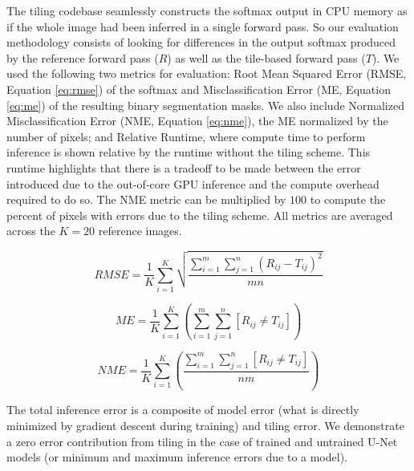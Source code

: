 \documentclass[runningheads]{llncs}
\begin{document}
The tiling codebase seamlessly constructs the softmax output in CPU memory as if the whole image had been inferred in a single forward pass. So our evaluation methodology consists of looking for differences in the output softmax produced by the reference forward pass ($R$) as well as the tile-based forward pass ($T$). We used the following two metrics for evaluation: Root Mean Squared Error (RMSE, Equation \ref{eq:rmse}) of the softmax and Misclassification Error (ME, Equation \ref{eq:me}) of the resulting binary segmentation masks. %
We also include Normalized Misclassification Error (NME, Equation \ref{eq:nme}), the ME normalized by the number of pixels; and Relative Runtime, where compute time to perform inference is shown relative by the runtime without the tiling scheme. This runtime highlights that there is a tradeoff to be made between the error introduced due to the out-of-core GPU inference and the compute overhead required to do so. The NME metric can be multiplied by $100$ to compute the percent of pixels with errors due to the tiling scheme.
All metrics are averaged across the $K = 20$ reference images.

\begin{equation}
RMSE = \frac{1}{K} \sum_{i=1}^{K} \sqrt{ \frac{\sum_{i = 1}^{m} \sum_{j = 1}^{n} (R_{ij} - T_{ij})^2}{mn}}
\label{eq:rmse}
\end{equation}

\begin{equation}
ME = \frac{1}{K} \sum_{i=1}^{K} \left( \sum_{i = 1}^{m} \sum_{j = 1}^{n} [ R_{ij} \neq T_{ij} ] \right) 
\label{eq:me}
\end{equation}

\begin{equation}
NME = \frac{1}{K} \sum_{i=1}^{K} \left( \frac{\sum_{i = 1}^{m} \sum_{j = 1}^{n} [ R_{ij} \neq T_{ij} ]}{nm} \right) 
\label{eq:nme}
\end{equation}

The total inference error is a composite of model error (what is directly minimized by gradient descent during training) and tiling error. We demonstrate a zero error contribution from tiling in the case of trained and untrained U-Net models (or minimum and maximum inference errors due to a model).
  
\end{document}
